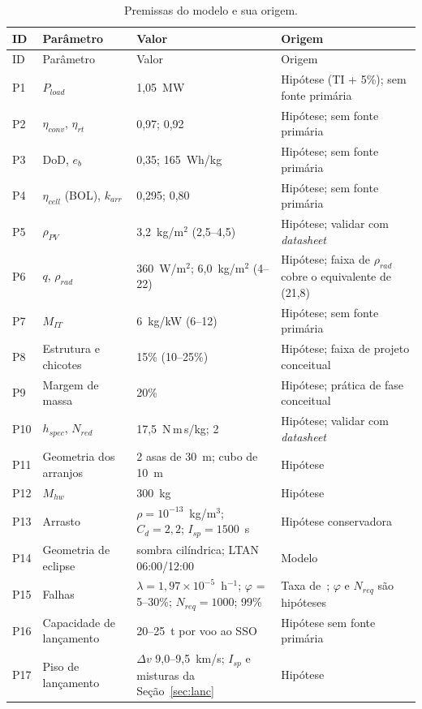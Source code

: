 \documentclass[11pt,a4paper]{article}
\begin{document}
\begin{longtable}{@{}p{}p{}p{}p{}@{}}
\caption{Premissas do modelo e sua origem.}\label{tab:premissas}\\
\toprule
ID & Parâmetro & Valor & Origem\\
\midrule
\endfirsthead
\toprule
ID & Parâmetro & Valor & Origem\\
\midrule
\endhead
\bottomrule
\endfoot
P1  & $P_{load}$ & 1,05~MW & Hipótese (TI + 5\%); sem fonte primária\\
P2  & $\eta_{conv}$, $\eta_{rt}$ & 0,97; 0,92 & Hipótese; sem fonte primária\\
P3  & DoD, $e_b$ & 0,35; 165~Wh/kg & Hipótese; sem fonte primária\\
P4  & $\eta_{cell}$ (BOL), $k_{arr}$ & 0,295; 0,80 & Hipótese; sem fonte primária\\
P5  & $\rho_{PV}$ & 3,2~kg/m$^2$ (2,5--4,5) & Hipótese; validar com \emph{datasheet}\\
P6  & $q$, $\rho_{rad}$ & 360~W/m$^2$; 6,0~kg/m$^2$ (4--22) & Hipótese; faixa de $\rho_{rad}$ cobre o equivalente de~\cite{r19} (21,8)\\
P7  & $M_{IT}$ & 6~kg/kW (6--12) & Hipótese; sem fonte primária\\
P8  & Estrutura e chicotes & 15\% (10--25\%) & Hipótese; faixa de projeto conceitual~\cite{r26}\\
P9  & Margem de massa & 20\% & Hipótese; prática de fase conceitual~\cite{r3}\\
P10 & $h_{spec}$, $N_{red}$ & 17,5~N\,m\,s/kg; 2 & Hipótese; validar com \emph{datasheet}\\
P11 & Geometria dos arranjos & 2 asas de 30~m; cubo de 10~m & Hipótese\\
P12 & $M_{hw}$ & 300~kg & Hipótese\\
P13 & Arrasto & $\rho=10^{-13}$~kg/m$^3$; $C_d=2{,}2$; $I_{sp}=1500$~s & Hipótese conservadora~\cite{r29}\\
P14 & Geometria de eclipse & sombra cilíndrica; LTAN 06:00/12:00 & Modelo~\cite{r25,r26}\\
P15 & Falhas & $\lambda=1{,}97\times10^{-5}$~h$^{-1}$; $\varphi$ = 5--30\%; $N_{req}=1000$; 99\% & Taxa de~\cite{r36}; $\varphi$ e $N_{req}$ são hipóteses\\
P16 & Capacidade de lançamento & 20--25~t por voo ao SSO & Hipótese sem fonte primária\\
P17 & Piso de lançamento & $\Delta v$ 9,0--9,5~km/s; $I_{sp}$ e misturas da Seção~\ref{sec:lanc} & Hipótese~\cite{r30}\\

\end{longtable}
\end{document}
